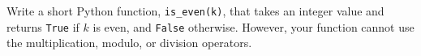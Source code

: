  \label{sssec:ex1_2}

Write a short Python function, \texttt{is\_even(k)}, that takes an integer value and returns \texttt{True} if $k$ is even, and \texttt{False} otherwise. However, your function cannot use the multiplication, modulo, or division operators.


